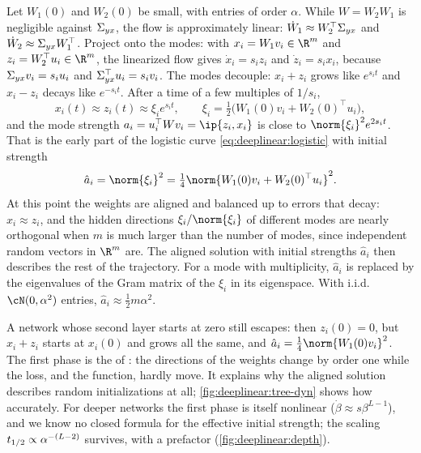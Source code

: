 \begin{refsection}
\begin{heuristic}[Heuristic derivation, $L=2$]
Let $W_1(0)$ and $W_2(0)$ be small, with entries of order $\alpha$. While $W=W_2W_1$ is negligible against $\Sigma_{yx}$, the flow is approximately linear: $\dot W_1\approx W_2^\top\Sigma_{yx}$ and $\dot W_2\approx\Sigma_{yx} W_1^\top$. Project onto the modes: with $x_i=W_1v_i\in\R^{m}$ and $z_i=W_2^\top u_i\in\R^m$, the linearized flow gives $\dot x_i=s_iz_i$ and $\dot z_i=s_ix_i$, because $\Sigma_{yx} v_i=s_iu_i$ and $\Sigma_{yx}^\top u_i=s_iv_i$. The modes decouple: $x_i+z_i$ grows like $e^{s_it}$ and $x_i-z_i$ decays like $e^{-s_it}$. After a time of a few multiples of $1/s_i$,
\[
  x_i(t)\approx z_i(t)\approx\xi_ie^{s_it},\qquad \xi_i=\tfrac12\bigl(W_1(0)v_i+W_2(0)^\top u_i\bigr),
\]
and the mode strength $a_i=u_i^\top Wv_i=\ip{z_i,x_i}$ is close to $\norm{\xi_i}^2e^{2s_it}$. That is the early part of the logistic curve \eqref{eq:deeplinear:logistic} with initial strength
\begin{equation}\label{eq:deeplinear:aeff}
  \hat a_i=\norm{\xi_i}^2=\tfrac14\norm{W_1(0)v_i+W_2(0)^\top u_i}^2 .
\end{equation}
At this point the weights are aligned and balanced up to errors that decay: $x_i\approx z_i$, and the hidden directions $\xi_i/\norm{\xi_i}$ of different modes are nearly orthogonal when $m$ is much larger than the number of modes, since independent random vectors in $\R^m$ are. The aligned solution with initial strengths $\hat a_i$ then describes the rest of the trajectory. For a mode with multiplicity, $\hat a_i$ is replaced by the eigenvalues of the Gram matrix of the $\xi_i$ in its eigenspace. With i.i.d.\ $\cN(0,\alpha^2)$ entries, $\hat a_i\approx\frac12m\alpha^2$.\qedhere
\end{heuristic}

A network whose second layer starts at zero still escapes: then $z_i(0)=0$, but $x_i+z_i$ starts at $x_i(0)$ and grows all the same, and $\hat a_i=\frac14\norm{W_1(0)v_i}^2$. The first phase is the  of \textcite{AtanasovEtAl2022}: the directions of the weights change by order one while the loss, and the function, hardly move. It explains why the aligned solution describes random initializations at all; \cref{fig:deeplinear:tree-dyn} shows how accurately. For deeper networks the first phase is itself nonlinear ($\dot\beta\approx s\beta^{L-1}$), and we know no closed formula for the effective initial strength; the scaling $t_{1/2}\propto\alpha^{-(L-2)}$ survives, with a prefactor (\cref{fig:deeplinear:depth}).


\end{refsection}
